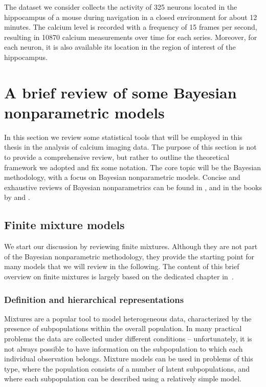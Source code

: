The dataset we consider collects the activity of 325 neurons located in the hippocampus of a mouse during navigation in a closed environment for about 12 minutes. The calcium level is recorded with a frequency of 15 frames per second, resulting in 10870 calcium measurements over time for each series.
Moreover, for each neuron, it is also available its location in the region of interest of the hippocampus.












\section{A brief review of some Bayesian nonparametric models} 
In this section we review some statistical tools that will be employed in this thesis in the analysis of calcium imaging data. The purpose of this section is not to provide a comprehensive review, but rather to outline the theoretical framework we adopted and fix some notation.
The core topic will be the Bayesian methodology, with a focus on Bayesian nonparametric models. Concise and exhaustive reviews of Bayesian nonparametrics can be found in \textcite{canale2016}, and in the books by \textcite{hjort2010} and \textcite{ghosal2017}.

\subsection{Finite mixture models}
\label{ch1_sec:finite_mix}
We start our discussion by reviewing finite mixtures. Although they are not part of the Bayesian nonparametric methodology, they provide the starting point for many models that we will review in the following. The content of this brief overview on finite mixtures is largely based on the dedicated chapter in~\textcite{gelman2013}.

\subsubsection*{Definition and hierarchical representations}
Mixtures are a popular tool to model heterogeneous data, characterized by the presence of subpopulations within the overall population. In many practical problems the data are collected under different conditions -- unfortunately, it is not always possible to have information on the subpopulation to which each individual observation belongs.
Mixture models can be used in problems of this type, where the population consists of a number of latent subpopulations, and where each subpopulation can be described using a relatively simple model. 


